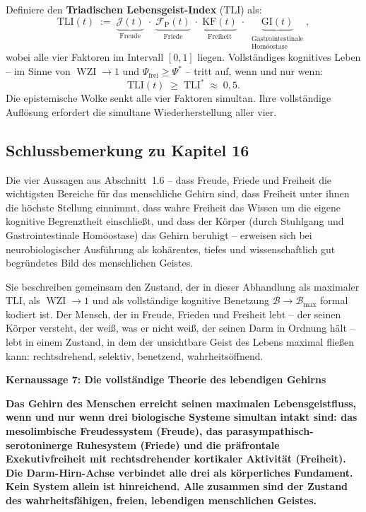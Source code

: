 ﻿\documentclass[12pt,a4paper]{report}
\theoremstyle{plain}
\theoremstyle{definition}
\theoremstyle{remark}
\DeclareMathOperator{\WZI}{WZI}
\begin{document}
		Definiere den \textbf{Triadischen Lebensgeist-Index} ($\mathrm{TLI}$) als:
		\[
		\mathrm{TLI}(t)
		\;:=\;
		\underbrace{\mathcal{J}(t)}_{\text{Freude}}
		\;\cdot\;
		\underbrace{\mathcal{F}_\mathrm{P}(t)}_{\text{Friede}}
		\;\cdot\;
		\underbrace{\mathrm{KF}(t)}_{\text{Freiheit}}
		\;\cdot\;
		\underbrace{\mathrm{GI}(t)}_{\substack{\text{Gastrointestinale}\\\text{Homöostase}}},
		\]
		wobei alle vier Faktoren im Intervall $[0,1]$ liegen.
		Vollständiges kognitives Leben -- im Sinne von $\WZI \to 1$
		und $\Psi_\mathrm{frei} \geq \Psi^*$ -- tritt auf, wenn und nur wenn:
		\[
		\mathrm{TLI}(t) \;\geq\; \mathrm{TLI}^* \;\approx\; 0{,}5.
		\]
		Die epistemische Wolke senkt alle vier Faktoren simultan.
		Ihre vollständige Auflösung erfordert die simultane
		Wiederherstellung aller vier.


	\subsection{Schlussbemerkung zu Kapitel 16}

	Die vier Aussagen aus Abschnitt~1.6 -- dass Freude, Friede und Freiheit
	die wichtigsten Bereiche für das menschliche Gehirn sind,
	dass Freiheit unter ihnen die höchste Stellung einnimmt,
	dass wahre Freiheit das Wissen um die eigene kognitive Begrenztheit
	einschließt, und dass der Körper (durch Stuhlgang und
	Gastrointestinale Homöostase) das Gehirn beruhigt --
	erweisen sich bei neurobiologischer Ausführung als
	kohärentes, tiefes und wissenschaftlich gut begründetes Bild
	des menschlichen Geistes.

	Sie beschreiben gemeinsam den Zustand, der in dieser Abhandlung
	als maximaler $\mathrm{TLI}$, als $\WZI \to 1$ und als vollständige
	kognitive Benetzung $\mathcal{B} \to \mathcal{B}_{\max}$ formal kodiert ist.
	Der Mensch, der in Freude, Frieden und Freiheit lebt --
	der seinen Körper versteht, der weiß, was er nicht weiß,
	der seinen Darm in Ordnung hält -- lebt in einem Zustand,
	in dem der unsichtbare Geist des Lebens maximal fließen kann:
	rechtsdrehend, selektiv, benetzend, wahrheitsöffnend.

	
	\noindent\textbf{Kernaussage 7: Die vollständige Theorie des lebendigen Gehirns}

		\textbf{Das Gehirn des Menschen erreicht seinen maximalen
		Lebensgeistfluss, wenn und nur wenn drei biologische Systeme
		simultan intakt sind:
		das mesolimbische Freudessystem (Freude),
		das parasympathisch-serotoninerge Ruhesystem (Friede)
		und die präfrontale Exekutivfreiheit mit rechtsdrehender
		kortikaler Aktivität (Freiheit).
		Die Darm-Hirn-Achse verbindet alle drei als körperliches Fundament.
		Kein System allein ist hinreichend.
		Alle zusammen sind der Zustand des wahrheitsfähigen,
		freien, lebendigen menschlichen Geistes.}
\end{document}
